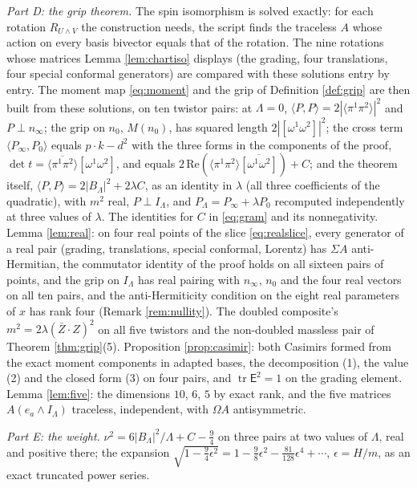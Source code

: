 \documentclass[11pt]{article}
\theoremstyle{definition}
\newcommand{\tr}{\operatorname{tr}}
\newcommand{\ip}[2]{\langle #1, #2\rangle}
\newcommand{\br}[1]{\langle #1\rangle}
\begin{document}
\emph{Part D: the grip theorem.} The spin isomorphism is solved exactly: for each rotation $R_{U\wedge V}$ the construction needs, the script finds the traceless $A$ whose action on every basis bivector equals that of the rotation. The nine rotations whose matrices Lemma \ref{lem:chartiso} displays (the grading, four translations, four special conformal generators) are compared with these solutions entry by entry. The moment map \eqref{eq:moment} and the grip of Definition \ref{def:grip} are then built from these solutions, on ten twistor pairs: at $\Lambda = 0$, $\ip{P}{P} = 2|\br{\pi^{1}\pi^{2}}|^{2}$ and $P \perp n_{\infty}$; the grip on $n_{0}$, $M(n_{0})$, has squared length $2|[\omega^{1}\omega^{2}]|^{2}$; the cross term $\ip{P_{\infty}}{P_{0}}$ equals $p\cdot k - d^{2}$ with the three forms in the components of the proof, $\det t = \overline{\br{\pi^{1}\pi^{2}}}[\omega^{1}\omega^{2}]$, and equals $2\,\mathrm{Re}(\br{\pi^{1}\pi^{2}}\overline{[\omega^{1}\omega^{2}]}) + C$; and the theorem itself, $\ip{P}{P} = 2|B_{\Lambda}|^{2} + 2\lambda C$, as an identity in $\lambda$ (all three coefficients of the quadratic), with $m^{2}$ real, $P \perp I_{\Lambda}$, and $P_{\Lambda} = P_{\infty} + \lambda P_{0}$ recomputed independently at three values of $\lambda$. The identities for $C$ in \eqref{eq:gram} and its nonnegativity. Lemma \ref{lem:real}: on four real points of the slice \eqref{eq:realslice}, every generator of a real pair (grading, translations, special conformal, Lorentz) has $\Sigma A$ anti-Hermitian, the commutator identity of the proof holds on all sixteen pairs of points, and the grip on $I_{\Lambda}$ has real pairing with $n_{\infty}$, $n_{0}$ and the four real vectors on all ten pairs, and the anti-Hermiticity condition on the eight real parameters of $x$ has rank four (Remark \ref{rem:nullity}). The doubled composite's $m^{2} = 2\lambda(\bar{Z}\cdot Z)^{2}$ on all five twistors and the non-doubled massless pair of Theorem \ref{thm:grip}(5). Proposition \ref{prop:casimir}: both Casimirs formed from the exact moment components in adapted bases, the decomposition (1), the value (2) and the closed form (3) on four pairs, and $\tr\mathsf{E}^{2} = 1$ on the grading element. Lemma \ref{lem:five}: the dimensions $10$, $6$, $5$ by exact rank, and the five matrices $A(e_{a}\wedge I_{\Lambda})$ traceless, independent, with $\Omega A$ antisymmetric.

\emph{Part E: the weight.} $\nu^{2} = 6|B_{\Lambda}|^{2}/\Lambda + C - \tfrac94$ on three pairs at two values of $\Lambda$, real and positive there; the expansion $\sqrt{1 - \tfrac94\epsilon^{2}} = 1 - \tfrac98\epsilon^{2} - \tfrac{81}{128}\epsilon^{4} + \cdots$, $\epsilon = H/m$, as an exact truncated power series.
\end{document}
